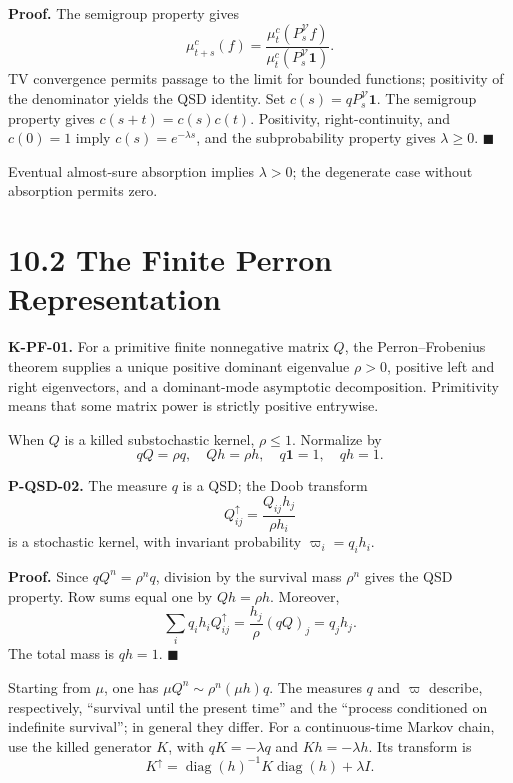 \documentclass[
  english,
  11pt,
  oneside]{book}
\begin{document}
\textbf{Proof.} The semigroup property gives \[\mu_{t+s}^c(f)=
\frac{\mu_t^c(P_s^{\mathcal V}f)}
{\mu_t^c(P_s^{\mathcal V}\mathbf1)}.\] TV convergence permits passage to the limit for bounded functions; positivity of the denominator yields the QSD identity. Set \(c(s)=qP_s^{\mathcal V}\mathbf1\). The semigroup property gives \(c(s+t)=c(s)c(t)\). Positivity, right-continuity, and \(c(0)=1\) imply \(c(s)=e^{-\lambda s}\), and the subprobability property gives \(\lambda\ge0\). \(\blacksquare\)

Eventual almost-sure absorption implies \(\lambda>0\); the degenerate case without absorption permits zero.

\section{10.2 The Finite Perron Representation}\label{the-finite-perron-representation}

\textbf{K-PF-01.} For a primitive finite nonnegative matrix \(Q\), the Perron--Frobenius theorem supplies a unique positive dominant eigenvalue \(\rho>0\), positive left and right eigenvectors, and a dominant-mode asymptotic decomposition. Primitivity means that some matrix power is strictly positive entrywise.

When \(Q\) is a killed substochastic kernel, \(\rho\le1\). Normalize by \[qQ=\rho q,\quad Qh=\rho h,\quad q\mathbf1=1,\quad qh=1.\]

\hypertarget{p-qsd-02}{}\label{p-qsd-02}

\textbf{P-QSD-02.} The measure \(q\) is a QSD; the Doob transform \[Q^\uparrow_{ij}=\frac{Q_{ij}h_j}{\rho h_i}\] is a stochastic kernel, with invariant probability \(\varpi_i=q_i h_i\).

\textbf{Proof.} Since \(qQ^n=\rho^nq\), division by the survival mass \(\rho^n\) gives the QSD property. Row sums equal one by \(Qh=\rho h\). Moreover, \[\sum_iq_i h_i Q^\uparrow_{ij}
=\frac{h_j}{\rho}(qQ)_j=q_jh_j.\] The total mass is \(qh=1\). \(\blacksquare\)

Starting from \(\mu\), one has \(\mu Q^n\sim\rho^n(\mu h)q\). The measures \(q\) and \(\varpi\) describe, respectively, ``survival until the present time'' and the ``process conditioned on indefinite survival''; in general they differ. For a continuous-time Markov chain, use the killed generator \(K\), with \(qK=-\lambda q\) and \(Kh=-\lambda h\). Its transform is \[K^\uparrow=\operatorname{diag}(h)^{-1}K\operatorname{diag}(h)+\lambda I.\]
\end{document}
